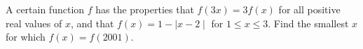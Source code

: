 A certain function $f$ has the properties that $f(3x)=3f(x)$ for all positive real values of $x$, and that $f(x)=1-\mid x-2 \mid$ for $1\leq x \leq 3$. Find the smallest $x$ for which $f(x)=f(2001)$.